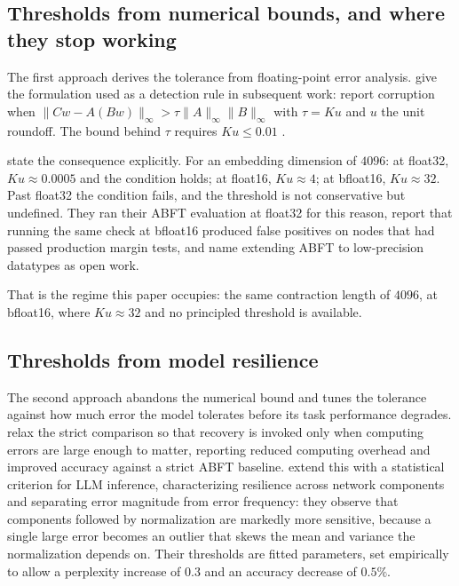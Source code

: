 \subsection{Thresholds from numerical bounds, and where they stop working}
\label{sec:related:bounds}

The first approach derives the tolerance from floating-point error analysis.
\citet{smith2015abft} give the formulation used as a detection rule in
subsequent work: report corruption when
$\lVert Cw - A(Bw) \rVert_\infty > \tau \lVert A \rVert_\infty
\lVert B \rVert_\infty$ with $\tau = Ku$ and $u$ the unit roundoff. The bound
behind $\tau$ requires $Ku \leq 0.01$ \citep[Eq.~2.7.11]{golub2013matrix}.

\citet{ma2025understanding} state the consequence explicitly. For an embedding
dimension of $4096$: at float32, $Ku \approx 0.0005$ and the condition holds; at
float16, $Ku \approx 4$; at bfloat16, $Ku \approx 32$. Past float32 the
condition fails, and the threshold is not conservative but undefined. They ran
their ABFT evaluation at float32 for this reason, report that running the same
check at bfloat16 produced false positives on nodes that had passed production
margin tests, and name extending ABFT to low-precision datatypes as open work.

That is the regime this paper occupies: the same contraction length of $4096$,
at bfloat16, where $Ku \approx 32$ and no principled threshold is available.

\subsection{Thresholds from model resilience}
\label{sec:related:resilience}

The second approach abandons the numerical bound and tunes the tolerance
against how much error the model tolerates before its task performance
degrades. \citet{xue2023approxabft} relax the strict comparison so that
recovery is invoked only when computing errors are large enough to matter,
reporting reduced computing overhead and improved accuracy against a strict
ABFT baseline. \citet{xie2025realm} extend this with a statistical criterion
for LLM inference, characterizing resilience across network components and
separating error magnitude from error frequency: they observe that components
followed by normalization are markedly more sensitive, because a single large
error becomes an outlier that skews the mean and variance the normalization
depends on. Their thresholds are fitted parameters, set empirically to allow a
perplexity increase of $0.3$ and an accuracy decrease of $0.5\%$.

